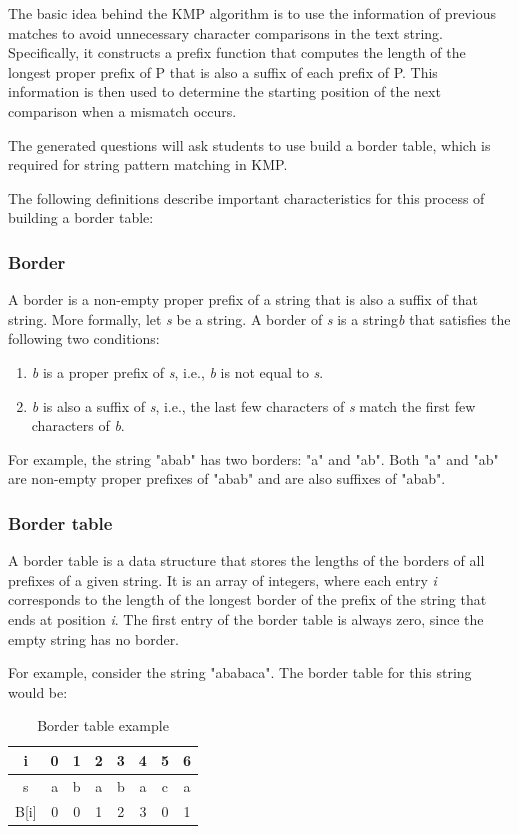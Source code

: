 \documentclass{l4proj}
\begin{document}
The basic idea behind the KMP algorithm is to use the information of previous matches to avoid unnecessary character comparisons in the text string. Specifically, it constructs a prefix function that computes the length of the longest proper prefix of P that is also a suffix of each prefix of P. This information is then used to determine the starting position of the next comparison when a mismatch occurs.

The generated questions will ask students to use build a border table, which is required for string pattern matching in KMP.

The following definitions describe important characteristics for this process of building a border table:
\subsubsection{Border}

A border is a non-empty proper prefix of a string that is also a suffix of that string. More formally, let \emph{s} be a string. A border of \emph{s} is a string\emph{b} that satisfies the following two conditions:
\begin{enumerate}
	\item
	\emph{b} is a proper prefix of \emph{s}, i.e., \emph{b} is not equal to \emph{s}.
	\item
	\emph{b} is also a suffix of \emph{s}, i.e., the last few characters of \emph{s} match the first few characters of \emph{b}.
\end{enumerate}
For example, the string "abab" has two borders: "a" and "ab". Both "a" and "ab" are non-empty proper prefixes of "abab" and are also suffixes of "abab".

\subsubsection{Border table}

 A border table is a data structure that stores the lengths of the borders of all prefixes of a given string. It is an array of integers, where each entry \emph{i} corresponds to the length of the longest border of the prefix of the string that ends at position \emph{i}. The first entry of the border table is always zero, since the empty string has no border.

For example, consider the string "ababaca". The border table for this string would be:

\begin{table}[!h]
\begin{center}
\begin{tabular}{|c||c|c|c|c|c|c|c|}
	\hline
	i & 0 & 1 & 2 & 3 & 4 & 5 & 6 \\
	\hline
	s & a & b & a & b & a & c & a \\
	\hline
	B[i] & 0 & 0 & 1 & 2 & 3 & 0 & 1 \\ 
	\hline
\end{tabular}
\caption{\label{tab:b-table}Border table example}
\end{center}
\end{table}
\end{document}
